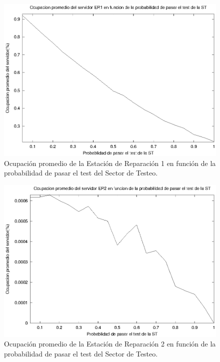 \documentclass[a4paper,10pt]{article}
\begin{document}
\begin{figure}[ht]
\begin{center}
\includegraphics[width=15cm]{./img/ss_ER1.eps}
\caption{\label{fig:ss_ER1} Ocupaci\'on promedio de la Estaci\'on de Reparaci\'on 1 en funci\'on de la probabilidad de pasar el test del Sector de Testeo.}
\end{center}
\end{figure}

\begin{figure}[ht]
\begin{center}
\includegraphics[width=15cm]{./img/ss_ER2.eps}
\caption{\label{fig:ss_ER2} Ocupaci\'on promedio de la Estaci\'on de Reparaci\'on 2 en funci\'on de la probabilidad de pasar el test del Sector de Testeo.}
\end{center}
\end{figure}
\end{document}

